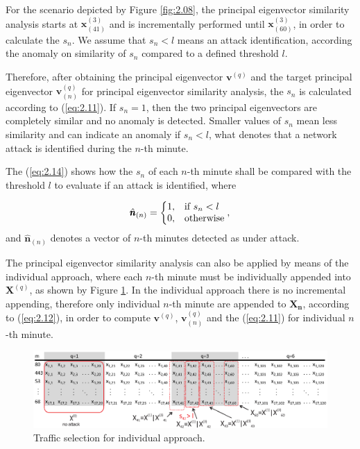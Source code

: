 For the scenario depicted by Figure \ref{fig:2.08}, the principal eigenvector similarity analysis starts at $\pmb{x}^{(3)}_{(41)}$ and is incrementally performed until $\pmb{x}^{(3)}_{(60)}$, in order to calculate the $s_n$. We assume that $s_n < l$ means an attack identification, according the anomaly on similarity of $s_n$ compared to a defined threshold $l$. 

Therefore, after obtaining the principal eigenvector $\pmb{v}^{(q)}$ and the target principal eigenvector $\pmb{v}_{(n)}^{(q)}$ for principal eigenvector similarity analysis, the $s_n$ is calculated according to (\ref{eq:2.11}). If $s_n = 1$, then the two principal eigenvectors are completely similar and no anomaly is detected. Smaller values of $s_n$ mean less similarity and can indicate an anomaly if $s_n < l$, what denotes that a network attack is identified during the $n$-th minute. 

The (\ref{eq:2.14}) shows how the $s_n$ of each $n$-th minute shall be compared with the threshold $l$ to evaluate if an attack is identified, where

\begin{equation}\label{eq:2.14}
  \hat{\pmb{n}}_{(n)}=\left\{
  \begin{array}{@{}ll@{}}
    1, & \text{if}\ s_n < l \\
    0, & \text{otherwise}
  \end{array}\right.,
\end{equation}
and $\hat{\pmb{n}}_{(n)}$ denotes a vector of $n$-th minutes detected as under attack.

The principal eigenvector similarity analysis can also be applied by means of the individual approach, where each $n$-th minute must be individually appended into $\pmb{X}^{(q)}$, as shown by Figure \ref{fig:2.09}. In the individual approach there is no incremental appending, therefore only individual $n$-th minute are appended to $\pmb{X_n}$, according to (\ref{eq:2.12}), in order to compute $\pmb{v}^{(q)}$, $\pmb{v}_{(n)}^{(q)}$ and the (\ref{eq:2.11}) for individual $n$-th minute.

\begin{figure}[h!]
     \includegraphics[width=15cm]{figures/ch2/individualized.eps}
     \caption{Traffic selection for individual approach.}
     \label{fig:2.09}
\end{figure}

